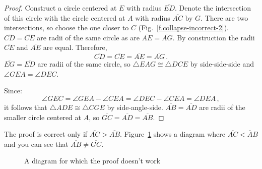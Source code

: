 \begin{proof}
Construct a circle centered at $E$ with radius $\overline{ED}$. Denote the intersection of this circle with the circle centered at $A$ with radius $\overline{AC}$ by $G$. There are two intersections, so choose the one closer to $C$ (Fig.~\ref{f.collapse-incorrect-2}).
$\overline{CD}=\overline{CE}$ are radii of the same circle as are $\overline{AE}=\overline{AG}$. By construction the radii $\overline{CE}$ and $\overline{AE}$ are equal. Therefore,
\[
\overline{CD} = \overline{CE} = \overline{AE} = \overline{AG}\,.
\]
$\overline{EG} = \overline{ED}$ are radii of the same circle, so $\triangle EAG\cong \triangle DCE$ by side-side-side and $\angle GEA = \angle DEC$.

Since:
\[
\angle GEC = \angle GEA \!-\!\angle CEA = \angle DEC\!-\!\angle CEA = \angle DEA\,,
\] it follows that $\triangle ADE\cong\triangle CGE$ by side-angle-side. $\overline{AB}=\overline{AD}$ are radii of the smaller circle centered at $A$, so $\overline{GC}=\overline{AD}=\overline{AB}$.
\end{proof}

The proof is correct only if $\overline{AC}>\overline{AB}$.  Figure~\ref{f.collapse-incorrect-4} shows a diagram where $\overline{AC}<\overline{A}B$ and you can see that $\overline{AB}\neq\overline{GC}$.

\begin{figure}[t]
\begin{center}
\end{center}
\caption{A diagram for which the proof doesn't work}\label{f.collapse-incorrect-4}
\end{figure}

\newpage

